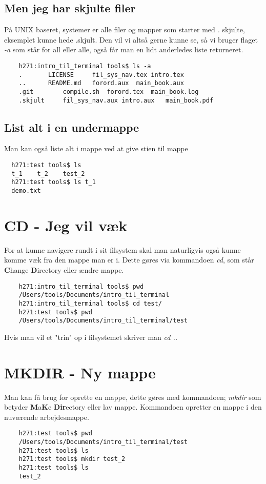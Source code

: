 \subsection*{Men jeg har skjulte filer}
På UNIX baseret, systemer er alle filer og mapper som starter med \textit{.} skjulte, eksemplet kunne hede .skjult. Den vil vi altså gerne kunne se, så vi bruger flaget \textit{-a} som står for all eller alle, også får man en lidt anderledes liste returneret.
\begin{lstlisting}
	h271:intro_til_terminal tools$ ls -a
	.		LICENSE		fil_sys_nav.tex	intro.tex	
	..		README.md	forord.aux	main_book.aux	
	.git		compile.sh	forord.tex	main_book.log	
	.skjult		fil_sys_nav.aux	intro.aux	main_book.pdf	
\end{lstlisting}
\subsection*{List alt i en undermappe}
Man kan også liste alt i mappe ved at give stien til mappe
\begin{lstlisting}
  h271:test tools$ ls
  t_1    t_2    test_2
  h271:test tools$ ls t_1
  demo.txt
\end{lstlisting}
\section{CD - Jeg vil væk}
For at kunne navigere rundt i sit filsystem skal man naturligvis også kunne komme væk fra den mappe man er i. Dette gøres via kommandoen \textit{cd}, som står \textbf{C}hange \textbf{D}irectory eller ændre mappe. 
\begin{lstlisting}
	h271:intro_til_terminal tools$ pwd
	/Users/tools/Documents/intro_til_terminal
	h271:intro_til_terminal tools$ cd test/
	h271:test tools$ pwd
	/Users/tools/Documents/intro_til_terminal/test
\end{lstlisting}
Hvis man vil et "trin" op i filsystemet skriver man \textit{cd ..}
\section{MKDIR - Ny mappe}
Man kan få brug for oprette en mappe, dette gøres med kommandoen; \textit{mkdir} som betyder \textbf{M}a\textbf{K}e \textbf{Dir}ectory eller lav mappe. Kommandoen opretter en mappe i den nuværende arbejdesmappe.
\begin{lstlisting}
	h271:test tools$ pwd
	/Users/tools/Documents/intro_til_terminal/test
	h271:test tools$ ls
	h271:test tools$ mkdir test_2
	h271:test tools$ ls
	test_2
\end{lstlisting}

